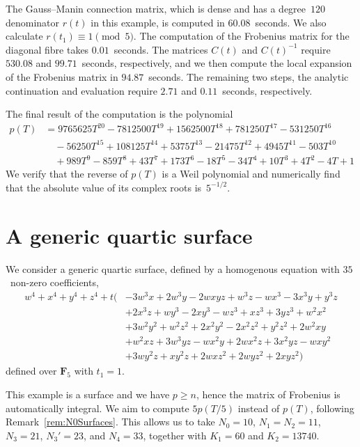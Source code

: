 The Gauss--Manin connection matrix, which is dense and has a degree~$120$ 
denominator $r(t)$ in this example, is computed in $60.08$~seconds.  We 
also calculate $r(t_1) \equiv 1 \pmod{5}$.  The computation of the 
Frobenius matrix for the diagonal fibre takes $0.01$~seconds.  The 
matrices $C(t)$ and $C(t)^{-1}$ require $530.08$ and $99.71$~seconds, 
respectively, and we then compute the local expansion of the Frobenius 
matrix in $94.87$~seconds.  The remaining two steps, the analytic continuation 
and evaluation require $2.71$ and $0.11$~seconds, respectively.

The final result of the computation is the polynomial 
\begin{align*}
p(T) & = 9765625 T^{20}-7812500 T^{19}+1562500 T^{18}+781250 T^{17}-531250 T^{16}\\
     & \quad -56250 T^{15}+108125 T^{14}+5375 T^{13}-21475 T^{12}+4945 T^{11}-503 T^{10}\\
     & \quad +989 T^9-859 T^8+43 T^7+173 T^6-18 T^5-34 T^4+10 T^3+4 T^2-4 T+1
\end{align*}
We verify that the reverse of $p(T)$ is a Weil polynomial and numerically 
find that the absolute value of its complex roots is~$5^{-1/2}$.

\section{A generic quartic surface}

We consider a generic quartic surface, defined by a homogenous equation 
with $35$~non-zero coefficients,
\begin{equation*}
\begin{split}
w^4 + x^4 + y^4 + z^4 
+ t \bigl( & -3 w^3 x + 2 w^3 y - 2 w x y z + w^3 z - w x^3 - 3 x^3 y + y^3 z \\ &
          + 2 x^3 z + w y^3 - 2 x y^3 - w z^3 + x z^3 + 3 y z^3 + w^2 x^2 \\ & 
          + 3 w^2 y^2 + w^2 z^2 + 2 x^2 y^2 - 2 x^2 z^2 + y^2 z^2 
          + 2 w^2 x y \\ & + w^2 x z + 3 w^3 y z - w x^2 y + 2 w x^2 z 
          + 3 x^2 y z - w x y^2 \\ & 
          + 3 w y^2 z + x y^2 z + 2 w x z^2 + 2 w y z^2 + 2 x y z^2 \bigr)
\end{split}
\end{equation*}
defined over $\mathbf{F}_5$ with $t_1 = 1$.

This example is a surface and we have $p \geq n$, hence the matrix of Frobenius 
is automatically integral.  We aim to compute $5 p(T/5)$ instead of $p(T)$, 
following Remark~\ref{rem:N0Surfaces}.  This allows us to take $N_0 = 10$, 
$N_1 = N_2 = 11$, $N_3 = 21$, $N_3' = 23$, and $N_4 = 33$, together with 
$K_1 = 60$ and $K_2 = 13740$.

